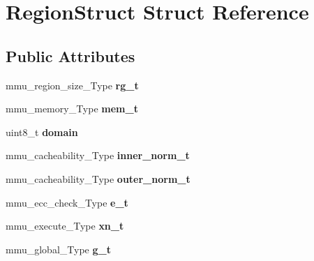 \hypertarget{struct_region_struct}{}\section{Region\+Struct Struct Reference}
\label{struct_region_struct}
\subsection*{Public Attributes}
\begin{DoxyCompactItemize}
\item 
mmu\+\_\+region\+\_\+size\+\_\+\+Type {\bfseries rg\+\_\+t}\hypertarget{struct_region_struct_af459d58d720e3c319b3ef5e877d27a2d}{}\label{struct_region_struct_af459d58d720e3c319b3ef5e877d27a2d}

\item 
mmu\+\_\+memory\+\_\+\+Type {\bfseries mem\+\_\+t}\hypertarget{struct_region_struct_a96eea15f88c7c48f2804d9dd62f13dc1}{}\label{struct_region_struct_a96eea15f88c7c48f2804d9dd62f13dc1}

\item 
uint8\+\_\+t {\bfseries domain}\hypertarget{struct_region_struct_abdfcd371daa9bf33f88a25f3b8cdeec0}{}\label{struct_region_struct_abdfcd371daa9bf33f88a25f3b8cdeec0}

\item 
mmu\+\_\+cacheability\+\_\+\+Type {\bfseries inner\+\_\+norm\+\_\+t}\hypertarget{struct_region_struct_abb79a425b194f3b7019b828124f74d3e}{}\label{struct_region_struct_abb79a425b194f3b7019b828124f74d3e}

\item 
mmu\+\_\+cacheability\+\_\+\+Type {\bfseries outer\+\_\+norm\+\_\+t}\hypertarget{struct_region_struct_a5f2d9c482e1a5e5ae18ce1e34b940be2}{}\label{struct_region_struct_a5f2d9c482e1a5e5ae18ce1e34b940be2}

\item 
mmu\+\_\+ecc\+\_\+check\+\_\+\+Type {\bfseries e\+\_\+t}\hypertarget{struct_region_struct_a490a04e6b4a2be661137dccc77f7ab3c}{}\label{struct_region_struct_a490a04e6b4a2be661137dccc77f7ab3c}

\item 
mmu\+\_\+execute\+\_\+\+Type {\bfseries xn\+\_\+t}\hypertarget{struct_region_struct_a3d361ef2b9edc3c7a3aa672a284555f3}{}\label{struct_region_struct_a3d361ef2b9edc3c7a3aa672a284555f3}

\item 
mmu\+\_\+global\+\_\+\+Type {\bfseries g\+\_\+t}\hypertarget{struct_region_struct_aaab551b9b577914a2dd63381aa8574f6}{}\label{struct_region_struct_aaab551b9b577914a2dd63381aa8574f6}


\end{DoxyCompactItemize}
